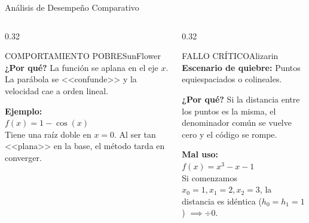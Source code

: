 \documentclass[aspectratio=169, t]{beamer}
\begin{document}
\begin{frame}{Análisis de Desempeño Comparativo}
\begin{columns}[T]
\begin{column}{0.32\textwidth}
\begin{performancebox}{COMPORTAMIENTO POBRE}{SunFlower}
                \textbf{¿Por qué?} La función se aplana en el eje $x$. La parábola se <<confunde>> y la velocidad cae a orden lineal. \\ \vspace{0.1cm}
                
                \textbf{Ejemplo:} \\
                $f(x) = 1 - \cos(x)$ \\
                Tiene una raíz doble en $x = 0$. Al ser tan <<plana>> en la base, el método tarda en converger.
            \end{performancebox}
        \end{column}
        
        \begin{column}{0.32\textwidth}
            \begin{performancebox}{FALLO CRÍTICO}{Alizarin}
                \textbf{Escenario de quiebre:} Puntos equiespaciados o colineales. \\ \vspace{0.1cm}
                
                \textbf{¿Por qué?} Si la distancia entre los puntos es la misma, el denominador común se vuelve cero y el código se rompe. \\ \vspace{0.1cm}
                
                \textbf{Mal uso:} \\
                $f(x) = x^3 - x - 1$ \\
                Si comenzamos $x_0=1, x_1=2, x_2=3$, la distancia es idéntica ($h_0=h_1=1$) $\implies \div 0$.
            \end{performancebox}
        \end{column}
        
    \end{columns}
\end{frame}
\end{document}
